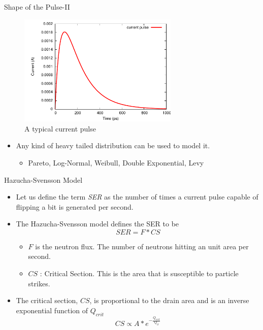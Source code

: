 \documentclass{beamer}
\begin{document}
\begin{frame}[shrink=10]{Shape of the Pulse-II}
 \begin{figure}[h]
  \includegraphics[width=3in]{pulse}
  \caption{\footnotesize A typical current pulse}
 \end{figure}
\begin{itemize}
 \item Any kind of heavy tailed distribution can be used to model it.
    \begin{itemize}
      \item Pareto, Log-Normal, Weibull, Double Exponential, Levy
    \end{itemize}
\end{itemize}
\end{frame}

\begin{frame}[shrink=5]{Hazucha-Svensson Model}
\begin{itemize}
 \item Let us define the term {\em SER} as the number of times a current pulse capable of flipping a bit is generated per second.
  \item The Hazucha-Svensson model defines the SER to be 
    \begin{equation*}
      SER = F * CS
    \end{equation*}
    \begin{itemize}
      \item $F$ is the neutron flux. The number of neutrons hitting an unit area per second.
      \item $CS$ : Critical Section. This is the area that is susceptible to particle strikes. 
    \end{itemize}
  \item The critical section, $CS$, is proportional to the drain area and is an inverse exponential function of $Q_{crit}$
      \begin{equation*}
	CS \propto A * e^{-\frac{Q_{crit}}{Q_S}}
      \end{equation*}
\end{itemize}
\end{frame}
\end{document}
